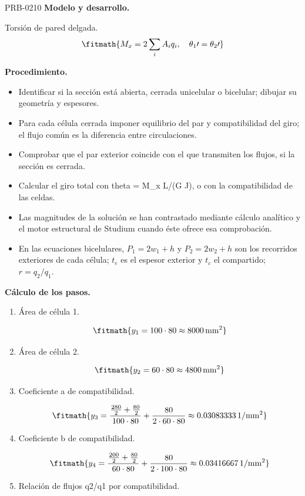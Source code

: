 \begin{studiumworked}{PRB-0210}
\textbf{Modelo y desarrollo.}

Torsión de pared delgada.\[\fitmath{M_x=2\sum_i A_iq_i,\quad \theta_1\prime=\theta_2\prime}\]

\textbf{Procedimiento.}\begin{itemize}\item Identificar si la sección está abierta, cerrada unicelular o bicelular; dibujar su geometría y espesores.
\item Para cada célula cerrada imponer equilibrio del par y compatibilidad del giro; el flujo común es la diferencia entre circulaciones.
\item Comprobar que el par exterior coincide con el que transmiten los flujos, si la sección es cerrada.
\item Calcular el giro total con theta = M\_x L/(G J), o con la compatibilidad de las celdas.
\item Las magnitudes de la solución se han contrastado mediante cálculo analítico y el motor estructural de Studium cuando éste ofrece esa comprobación.
\item En las ecuaciones bicelulares, $P_1=2w_1+h$ y $P_2=2w_2+h$ son los recorridos exteriores de cada célula; $t_e$ es el espesor exterior y $t_c$ el compartido; $r=q_2/q_1$.\end{itemize}

\textbf{Cálculo de los pasos.}

\begin{enumerate}

\item Área de célula 1.

\[\fitmath{y_{1}=100\cdot 80\approx 8000\,\mathrm{mm^{2}}}\]

\item Área de célula 2.

\[\fitmath{y_{2}=60\cdot 80\approx 4800\,\mathrm{mm^{2}}}\]

\item Coeficiente a de compatibilidad.

\[\fitmath{y_{3}=\frac{\frac{280}{2}+\frac{80}{2}}{100\cdot 80}+\frac{80}{2\cdot 60\cdot 80}\approx 0.03083333\,\mathrm{1/mm^{2}}}\]

\item Coeficiente b de compatibilidad.

\[\fitmath{y_{4}=\frac{\frac{200}{2}+\frac{80}{2}}{60\cdot 80}+\frac{80}{2\cdot 100\cdot 80}\approx 0.03416667\,\mathrm{1/mm^{2}}}\]

\item Relación de flujos q2/q1 por compatibilidad.


\end{enumerate}
\end{studiumworked}
